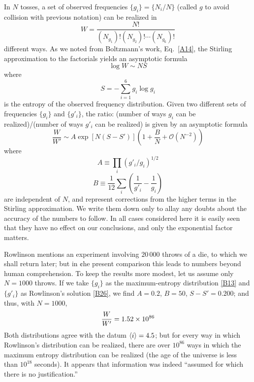 In $N$ tosses, a set of observed frequencies $\{g_i\}= \{N_i/N\}$ (called $g$ to avoid collision with previous notation) can be realized in
\begin{equation}
	\label{B27}
	W = \frac{N!}{(N_{g_1})! (N_{g_2})! \cdots (N_{g_6})!}
\end{equation}
different ways. As we noted from Boltzmann's work, Eq.~\eqref{A14}, the Stirling approximation to the factorials yields an asymptotic formula
\begin{equation}
	\label{B28}
	\log W \sim NS
\end{equation}
where
\begin{equation}
	\label{B29}
	S = -\sum_{i=1}^{6} g_i \log g_i
\end{equation}
is the entropy of the observed frequency distribution.
Given two different sets of frequencies $\{g_i\}$ and $\{g'_i\}$, the ratio: (number of ways $g_i$ can be realized)/(number of ways $g'_i$ can be realized) is given by an asymptotic formula
\begin{equation}
	\label{B30}
	\frac{W	}{W'} \sim A \exp[N(S-S')] \left(1 + \frac{B}{N} + \mathcal{O}\left(N^{-2}\right)\right)
\end{equation}
where
\begin{equation}
	\label{B31}
	A \equiv \prod_{i} (g'_i/g_i)^{1/2}
\end{equation}
\begin{equation}
	\label{B32}
	B \equiv \frac{1}{12}\sum_{i} \left(\frac{1}{g'_i} - \frac{1}{g_i}\right)
\end{equation}
are independent of $N$, and represent corrections from the higher terms in the Stirling approximation.
We write them down only to allay any doubts about the accuracy of the numbers to follow.
In all cases considered here it is easily seen that they have no effect on our conclusions, and only the exponential factor matters.

Rowlinson mentions an experiment involving $20\,000$ throws of a die, to which we shall return later; but in ¢he present comparison this leads to numbers beyond human comprehension.
To keep the results more modest, let us assume only $N = 1000$ throws.
If we take $\{g_i\}$ as the maximum-entropy distribution \eqref{B13} and $\{g'_i\}$ as Rowlinson's solution \eqref{B26}, we find $A = 0.2$, $B = 50$, $S-S' = 0.200$; and thus, with $N = 1000$,
\begin{equation}
	\refstepcounter{equation}
	\label{B34}
	\frac{W	}{W'} = 1.52 \times 10^{86}
\end{equation}
Both distributions agree with the datum $\langle i\rangle = 4.5$; but for every way in which Rowlinson's distribution can be realized, there are over $10^{86}$ ways in which the maximum entropy distribution can be realized (the age of the universe is less than $10^{18}$ seconds).
It appears that information was indeed ``assumed for which there is no justification.''

